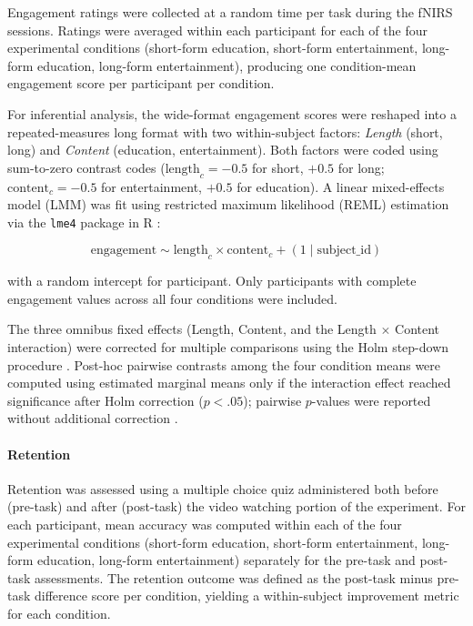 \documentclass[10pt, twocolumn]{article}
\begin{document}
Engagement ratings were collected at a random time per task during the fNIRS sessions. Ratings were averaged within each participant for each of the four experimental conditions (short-form education, short-form entertainment, long-form education, long-form entertainment), producing one condition-mean engagement score per participant per condition.

For inferential analysis, the wide-format engagement scores were reshaped into a repeated-measures long format with two within-subject factors: \textit{Length} (short, long) and \textit{Content} (education, entertainment). Both factors were coded using sum-to-zero contrast codes ($\text{length}_c = -0.5$ for short, $+0.5$ for long; $\text{content}_c = -0.5$ for entertainment, $+0.5$ for education). A linear mixed-effects model (LMM) was fit using restricted maximum likelihood (REML) estimation via the \texttt{lme4} package in R \cite{Bates2014FittingLM}:

\begin{equation}
\text{engagement} \sim \text{length}_c \times \text{content}_c + (1 \mid \text{subject\_id})
\end{equation}

\noindent with a random intercept for participant. Only participants
with complete engagement values across all four conditions were included.

The three omnibus fixed effects (Length, Content, and the Length $\times$ Content interaction)
were corrected for multiple comparisons using the Holm step-down procedure
\cite{Holm1979ASS}. Post-hoc pairwise contrasts among the four condition means were computed
using estimated marginal means only if the
interaction effect reached significance after Holm correction ($p < .05$); pairwise
$p$-values were reported without additional correction \cite{emmeansR, Searle1980PopulationMM} .

\paragraph{Retention}

Retention was assessed using a multiple choice quiz administered both before (pre-task) and
after (post-task) the video watching portion of the experiment. For each participant, mean accuracy was computed within each of the four experimental conditions (short-form education, short-form entertainment, long-form education, long-form entertainment) separately for the pre-task and post-task assessments. The retention outcome was defined as the post-task minus pre-task difference score per condition, yielding a within-subject improvement metric for each condition.
\end{document}

